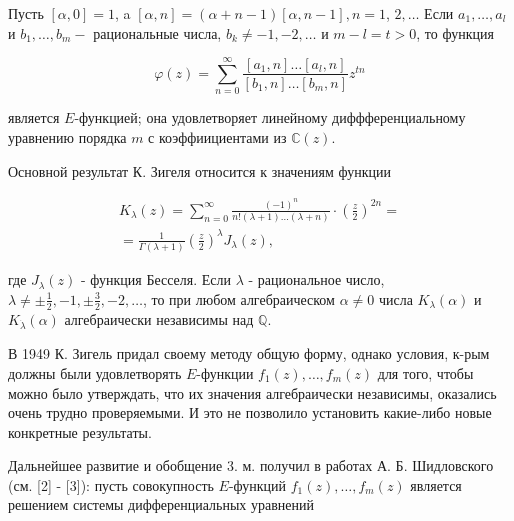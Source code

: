 \documentclass[10pt]{article}
\begin{document}
Пусть $[\alpha, 0]=1$, a $[\alpha, n]=(\alpha+n-1)[\alpha, n-1], n=1$, $2, \ldots$ Если $a_{1}, \ldots, a_{l}$ и $b_{1}, \ldots, b_{m}-$ рациональные числа, $b_{k} \neq-1,-2, \ldots$ и $m-l=t>0$, то функция



\[

\varphi(z)=\sum_{n=0}^{\infty} \frac{\left[a_{1}, n\right] \ldots\left[a_{l}, n\right]}{\left[b_{1}, n\right] \ldots\left[b_{m}, n\right]} z^{t n}

\]



является $E$-функцией; она удовлетворяет линейному диффференциальному уравнению порядка $m$ с коэффиициентами из $\mathbb{C}(z)$.



Основной результат К. Зигеля относится к значениям функции



\[

\begin{gathered}

K_{\lambda}(z)=\sum_{n=0}^{\infty} \frac{(-1)^{n}}{n !(\lambda+1) \ldots(\lambda+n)} \cdot\left(\frac{z}{2}\right)^{2 n}= \\

=\frac{1}{\Gamma(\lambda+1)}\left(\frac{z}{2}\right)^{\lambda} J_{\lambda}(z),

\end{gathered}

\]



где $J_{\lambda}(z)$ - функция Бесселя. Если $\lambda$ - рациональное число, $\lambda \neq \pm \frac{1}{2},-1, \pm \frac{3}{2},-2, \ldots$, то при любом алгебраическом $\alpha \neq 0$ числа $K_{\lambda}(\alpha)$ и $K_{\dot{\lambda}}(\alpha)$ алгебраически независимы над $\mathbb{Q}$.



В 1949 К. Зигель придал своему методу общую форму, однако условия, к-рым должны были удовлетворять $E$-функции $f_{1}(z), \ldots, f_{m}(z)$ для того, чтобы можно было утверждать, что их значения алгебраически независимы, оказались очень трудно проверяемыми. И это не позволило установить какие-либо новые конкретные результаты.



Дальнейшее развитие и обобщение 3. м. получил в работах А. Б. Шидловского (см. [2] - [3]): пусть совокупность $E$-функций $f_{1}(z), \ldots, f_{m}(z)$ является решением системы дифференциальных уравнений
\end{document}
